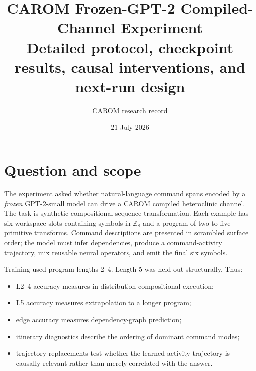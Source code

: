 \documentclass[10pt]{article}
\title{\textbf{CAROM Frozen-GPT-2 Compiled-Channel Experiment}\\
Detailed protocol, checkpoint results, causal interventions, and next-run design}
\author{CAROM research record}
\date{21 July 2026}
\begin{document}
\maketitle

\begin{center}
\end{center}

\section{Question and scope}

The experiment asked whether natural-language command spans encoded by a
\emph{frozen} GPT-2-small model can drive a CAROM compiled heteroclinic channel.
The task is synthetic compositional sequence transformation. Each example has
six workspace slots containing symbols in $\mathbb{Z}_8$ and a program of two
to five primitive transforms. Command descriptions are presented in scrambled
surface order; the model must infer dependencies, produce a command-activity
trajectory, mix reusable neural operators, and emit the final six symbols.

Training used program lengths 2--4. Length 5 was held out structurally. Thus:

\begin{itemize}
\item L2--4 accuracy measures in-distribution compositional execution;
\item L5 accuracy measures extrapolation to a longer program;
\item edge accuracy measures dependency-graph prediction;
\item itinerary diagnostics describe the ordering of dominant command modes;
\item trajectory replacements test whether the learned activity trajectory is
causally relevant rather than merely correlated with the answer.
\end{itemize}
\end{document}
